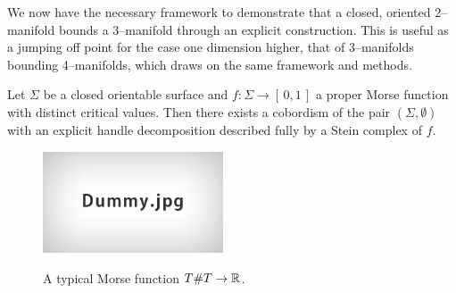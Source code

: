 \label{sec:2bound3}

We now have the necessary framework to demonstrate that a closed, oriented 2--manifold bounds a 3--manifold through an explicit construction.
This is useful as a jumping off point for the case one dimension higher, that of 3--manifolds bounding 4--manifolds, which draws on the same framework and methods.

\begin{theorem}
	\label{thm:2bound3}
	Let $\Sigma$ be a closed orientable surface and $f:\Sigma\to[\,0,1\,]$ a proper Morse function with distinct critical values.
	Then there exists a cobordism of the pair $(\Sigma,\emptyset)$ with an explicit handle decomposition described fully by a Stein complex of $f$.
\end{theorem}

\begin{figure}
	\caption{A typical Morse function $T\# T\to\mathbb{R}$.}
	\centering
	\includegraphics[height=3cm]{figures/dummy.jpg}
	\label{fig:typicalmorse}
\end{figure}

